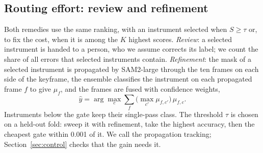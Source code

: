 \subsection{Routing effort: review and refinement}
\label{sec:refine}
Both remedies use the same ranking, with an instrument selected when $S\ge\tau$ or, to fix the cost, when it is among the $K$ highest scores.
\emph{Review}: a selected instrument is handed to a person, who we assume corrects its label; we count the share of all errors that selected instruments contain.
\emph{Refinement}: the mask of a selected instrument is propagated by SAM2-large through the ten frames on each side of the keyframe, the ensemble classifies the instrument on each propagated frame $f$ to give $\mu_f$, and the frames are fused with confidence weights,
\begin{equation}
\hat{y} = \arg\max_c \sum_f \big(\max_{c'} \mu_{f,c'}\big)\, \mu_{f,c}.
\label{eq:fuse}
\end{equation}
Instruments below the gate keep their single-pass class.
The threshold $\tau$ is chosen on a held-out fold: sweep it with refinement, take the highest accuracy, then the cheapest gate within 0.001 of it.
We call the propagation tracking; Section~\ref{sec:control} checks that the gain needs it.
